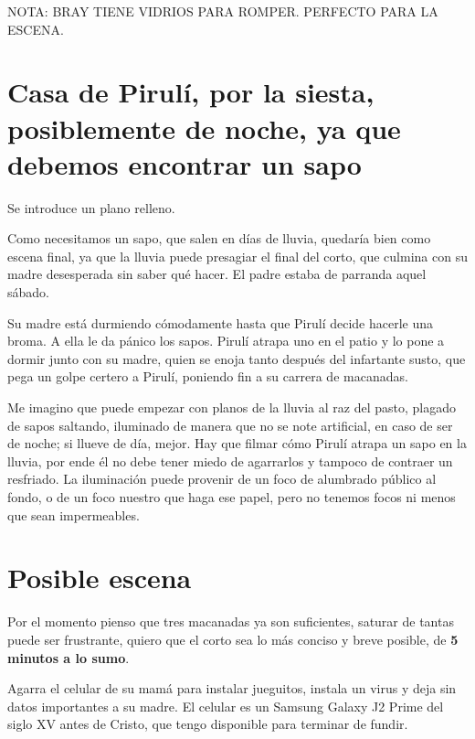 \documentclass[12pt, a4paper]{article}
\begin{document}
  NOTA: BRAY TIENE VIDRIOS PARA ROMPER. PERFECTO PARA LA ESCENA.

  \section{Casa de Pirulí, por la siesta, posiblemente de noche, ya que debemos encontrar un sapo}
  Se introduce un plano relleno.
  \vspace{7pt}

  Como necesitamos un sapo, que salen en días de lluvia, quedaría bien como escena final, ya que la lluvia puede presagiar el final del corto,
  que culmina con su madre desesperada sin saber qué hacer. El padre estaba de parranda aquel sábado.
  \vspace{7pt}

  Su madre está durmiendo cómodamente hasta que Pirulí decide hacerle una broma. A ella le da pánico los sapos. Pirulí atrapa uno en el patio
  y lo pone a dormir junto con su madre, quien se enoja tanto después del infartante susto, que pega un golpe certero a Pirulí, poniendo 
  fin a su carrera de macanadas.
  \vspace{7pt}


  Me imagino que puede empezar con planos de la lluvia al raz del pasto, plagado de sapos saltando, iluminado de manera que no se note
  artificial, en caso de ser de noche; si llueve de día, mejor. Hay que filmar cómo Pirulí atrapa un sapo en la lluvia, por ende él
  no debe tener miedo de agarrarlos y tampoco de contraer un resfriado. La iluminación puede provenir de un foco de alumbrado público al fondo,
  o de un foco nuestro que haga ese papel, pero no tenemos focos ni menos que sean impermeables.

  \section{Posible escena}
  Por el momento pienso que tres macanadas ya son suficientes, saturar de tantas puede ser frustrante, quiero que el corto sea lo más conciso
  y breve posible, de \textbf{5 minutos a lo sumo}.

  Agarra el celular de su mamá para instalar jueguitos, instala un virus y deja sin datos importantes a su madre.
  El celular es un Samsung Galaxy J2 Prime del siglo XV antes de Cristo, que tengo disponible para terminar de fundir.
\end{document}
